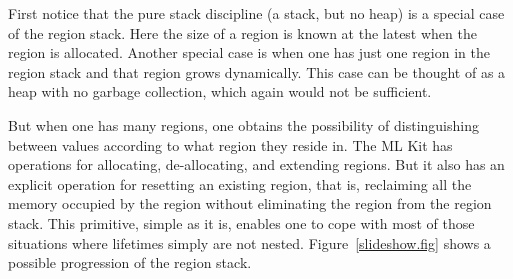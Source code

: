 \documentclass[12pt]{book}
\begin{document}
First notice that the pure stack discipline (a stack, but no heap) 
is a special case of the region stack. Here the size of a region is known
at the latest when the region is allocated. Another special case is when 
one has just one region in the region stack and that region grows dynamically.
This case can be thought of as a heap with no garbage collection, which again
would not be sufficient.

But when one has many regions, one obtains the possibility of distinguishing
between values according to what region they reside in. 
The ML Kit has operations for allocating, 
de-allocating, and extending regions. But it also 
has an explicit operation for resetting an existing region, that is, reclaiming all the memory
occupied by the region without eliminating the region from the region stack.
This primitive, simple as it is, enables one to cope with most of those
situations where lifetimes simply are not nested. Figure~\ref{slideshow.fig}
shows a possible progression of the region stack.
\end{document}
